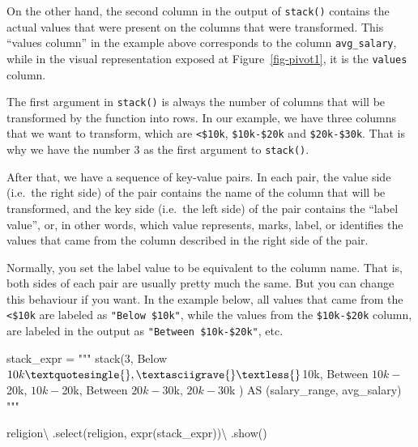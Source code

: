 \documentclass[
  11pt,
  letterpaper,
  DIV=11,
  numbers=noendperiod]{scrreprt}
\newenvironment{Shaded}{\begin{snugshade}}{\end{snugshade}}
\newcommand{\NormalTok}[1]{\textcolor[rgb]{0.00,0.23,0.31}{#1}}
\newcommand{\OperatorTok}[1]{\textcolor[rgb]{0.37,0.37,0.37}{#1}}
\newcommand{\StringTok}[1]{\textcolor[rgb]{0.13,0.47,0.30}{#1}}
\begin{document}
On the other hand, the second column in the output of \texttt{stack()}
contains the actual values that were present on the columns that were
transformed. This ``values column'' in the example above corresponds to
the column \texttt{avg\_salary}, while in the visual representation
exposed at Figure~\ref{fig-pivot1}, it is the \texttt{values} column.

The first argument in \texttt{stack()} is always the number of columns
that will be transformed by the function into rows. In our example, we
have three columns that we want to transform, which are
\texttt{\textless{}\$10k}, \texttt{\$10k-\$20k} and
\texttt{\$20k-\$30k}. That is why we have the number 3 as the first
argument to \texttt{stack()}.

After that, we have a sequence of key-value pairs. In each pair, the
value side (i.e.~the right side) of the pair contains the name of the
column that will be transformed, and the key side (i.e.~the left side)
of the pair contains the ``label value'', or, in other words, which
value represents, marks, label, or identifies the values that came from
the column described in the right side of the pair.

Normally, you set the label value to be equivalent to the column name.
That is, both sides of each pair are usually pretty much the same. But
you can change this behaviour if you want. In the example below, all
values that came from the \texttt{\textless{}\$10k} are labeled as
\texttt{"Below\ \$10k"}, while the values from the \texttt{\$10k-\$20k}
column, are labeled in the output as \texttt{"Between\ \$10k-\$20k"},
etc.

\begin{Shaded}
\begin{Highlighting}[]
\NormalTok{stack\_expr }\OperatorTok{=} \StringTok{"""}
\StringTok{stack(3,}
\StringTok{    \textquotesingle{}Below $10k\textquotesingle{}, \textasciigrave{}\textless{}$10k\textasciigrave{},}
\StringTok{    \textquotesingle{}Between $10k{-}$20k\textquotesingle{}, \textasciigrave{}$10k{-}$20k\textasciigrave{},}
\StringTok{    \textquotesingle{}Between $20k{-}$30k\textquotesingle{}, \textasciigrave{}$20k{-}$30k\textasciigrave{}}
\StringTok{) AS (salary\_range, avg\_salary)}
\StringTok{"""}

\NormalTok{religion}\OperatorTok{\textbackslash{}}
\NormalTok{    .select(}\StringTok{\textquotesingle{}religion\textquotesingle{}}\NormalTok{, expr(stack\_expr))}\OperatorTok{\textbackslash{}}
\NormalTok{    .show()}
\end{Highlighting}
\end{Shaded}
\end{document}
